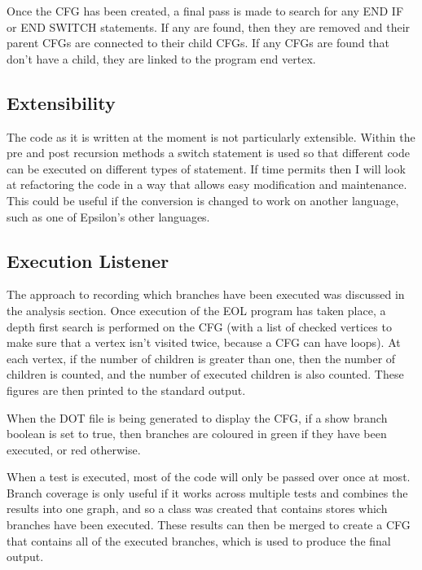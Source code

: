Once the CFG has been created, a final pass is made to search for any END IF or END SWITCH statements. If any are found, then they are removed and their parent CFGs are connected to their child CFGs. If any CFGs are found that don't have a child, they are linked to the program end vertex.

\subsection{Extensibility}

The code as it is written at the moment is not particularly extensible. Within the pre and post recursion methods a switch statement is used so that different code can be executed on different types of statement. If time permits then I will look at refactoring the code in a way that allows easy modification and maintenance. This could be useful if the conversion is changed to work on another language, such as one of Epsilon's other languages. 

\subsection{Execution Listener}

The approach to recording which branches have been executed was discussed in the analysis section. Once execution of the EOL program has taken place, a depth first search is performed on the CFG (with a list of checked vertices to make sure that a vertex isn't visited twice, because a CFG can have loops). At each vertex, if the number of children is greater than one, then the number of children is counted, and the number of executed children is also counted. These figures are then printed to the standard output.

When the DOT file is being generated to display the CFG, if a show branch boolean is set to true, then branches are coloured in green if they have been executed, or red otherwise.

When a test is executed, most of the code will only be passed over once at most. Branch coverage is only useful if it works across multiple tests and combines the results into one graph, and so a class was created that contains stores which branches have been executed. These results can then be merged to create a CFG that contains all of the executed branches, which is used to produce the final output.
